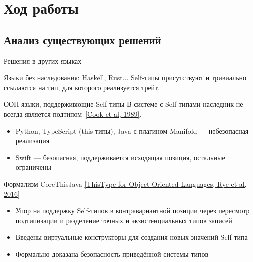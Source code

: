 \documentclass[aspectratio=169,usenames,dvipsnames]{beamer}
\begin{document}
    \section{Ход работы}


    \subsection{Анализ существующих решений}

    \begin{frame}[fragile]{Решения в других языках}

        \begin{block}{Языки без наследования: Haskell, Rust...}
            Self-типы присутствуют и тривиально ссылаются на тип, для которого реализуется трейт.
        \end{block}

        \begin{block}{ООП языки, поддерживющие Self-типы}
            В системе с Self-типами наследник не всегда является подтипом~\href{https://dl.acm.org/doi/pdf/10.1145/96709.96721}{[Cook et al, 1989]}.
            \begin{itemize}
                \item Python, TypeScript (this-типы), Java с плагином Manifold --- небезопасная реализация
                \item Swift --- безопасная, поддерживается исходящая позиция, остальные ограничены
            \end{itemize}
        \end{block}

        \begin{block}{Формализм CoreThisJava \href{https://dl.acm.org/doi/pdf/10.1145/2888392}{[ThisType for Object-Oriented Languages, Rye et al, 2016]}}
            \begin{itemize}
                \item Упор на поддержку Self-типов в контравариантной позиции через пересмотр подтипизации и разделение точных и экзистенциальных типов записей
                \item Введены виртуальные конструкторы для создания новых значений Self-типа
                \item Формально доказана безопасность приведённой системы типов
            \end{itemize}
        \end{block}
    \end{frame}
\end{document}
